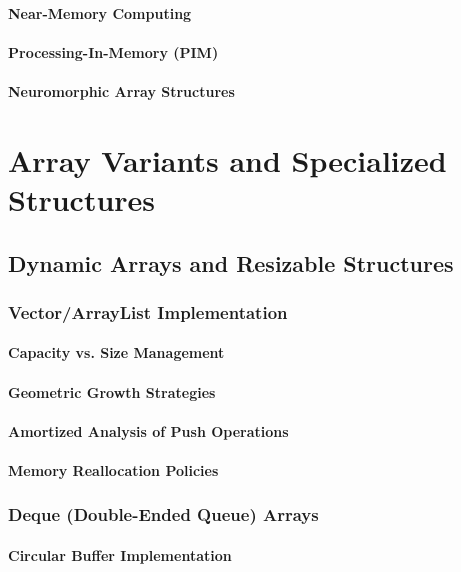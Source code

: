 \documentclass[12pt, oneside]{book}
\begin{document}
\subsubsection{Near-Memory Computing}
\subsubsection{Processing-In-Memory (PIM)}
\subsubsection{Neuromorphic Array Structures}


\chapter{Array Variants and Specialized Structures}

\section{Dynamic Arrays and Resizable Structures}
\subsection{Vector/ArrayList Implementation}
\subsubsection{Capacity vs. Size Management}
\subsubsection{Geometric Growth Strategies}
\subsubsection{Amortized Analysis of Push Operations}
\subsubsection{Memory Reallocation Policies}

\subsection{Deque (Double-Ended Queue) Arrays}
\subsubsection{Circular Buffer Implementation}
\end{document}
